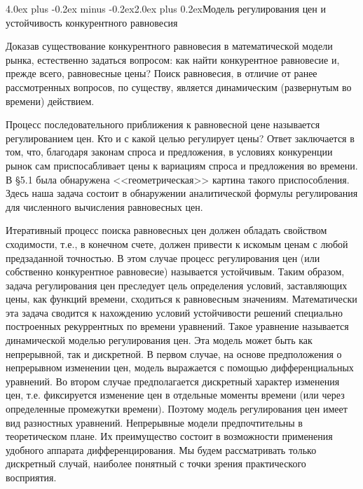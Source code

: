 \documentclass[12pt, 4paper]{book}
\makeatletter
\renewcommand{\section}{\@startsection{section}{1}{1pt}%
	{4.0ex plus -0.2ex minus -0.2ex}{2.0ex plus 0.2ex}{\centering\bf}}%
\makeatother
\begin{document}
{\begin{center}
\section{Модель регулирования цен и устойчивость конкурентного равновесия}
\end{center}
\par

Доказав существование конкурентного равновесия в математической модели рынка, естественно задаться вопросом: как найти конкурентное равновесие и, прежде всего, равновесные цены? Поиск равновесия, в отличие от ранее рассмотренных вопросов, по существу, является динамическим (развернутым во времени) действием.
\par

Процесс последовательного приближения к равновесной цене называется регулированием цен. Кто и с какой целью регулирует цены? Ответ заключается в том, что, благодаря законам спроса и предложения, в условиях конкуренции рынок сам приспосабливает цены к вариациям спроса и предложения во времени. В §5.1 была обнаружена <<геометрическая>> картина такого приспособления. Здесь наша задача состоит в обнаружении аналитической формулы регулирования для численного вычисления равновесных цен.
\par

Итеративный процесс поиска равновесных цен должен обладать свойством сходимости, т.е., в конечном счете, должен привести к искомым ценам с любой предзаданной точностью. В этом случае процесс регулирования цен (или собственно конкурентное равновесие) называется устойчивым.
Таким образом, задача регулирования цен преследует цель определения условий, заставляющих цены, как функций времени, сходиться к равновесным значениям. Математически эта задача сводится к нахождению условий устойчивости решений специально построенных рекуррентных по времени уравнений. Такое уравнение называется динамической моделью регулирования цен. Эта модель может быть как непрерывной, так и дискретной. В первом случае, на основе предположения о непрерывном изменении цен, модель выражается с помощью дифференциальных уравнений. Во втором случае предполагается дискретный характер изменения цен, т.е. фиксируется изменение цен в отдельные моменты времени (или через определенные промежутки времени). Поэтому модель регулирования цен имеет вид разностных уравнений. Непрерывные модели предпочтительны в теоретическом плане. Их преимущество состоит в возможности применения удобного аппарата дифференцирования. Мы будем рассматривать только дискретный случай, наиболее понятный с точки зрения практического восприятия.
\par

}
\end{document}
